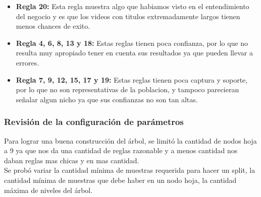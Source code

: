 \begin{itemize}
\begin{itemize}
                    \item \textbf{Regla 20:} Esta regla muestra algo que
                    habiamos visto en el entendimiento del negocio y es que los
                    videos con titulos extremadamente largos tienen menos
                    chances de exito.

                    \item \textbf{Regla 4, 6, 8, 13 y 18:} Estas reglas tienen
                    poca confianza, por lo que no resulta muy apropiado tener
                    en cuenta sus resultados ya que pueden llevar a errores.

                    \item \textbf{Regla 7, 9, 12, 15, 17 y 19:} Estas reglas
                    tienen poca captura y soporte, por lo que no son
                    representativas de la poblacion, y tampoco parecieran
                    señalar algun nicho ya que sus confianzas no son tan altas.

                \end{itemize}
            \end{itemize}

    \subsubsection{Revisión de la configuración de parámetros}
        Para lograr una buena construcción del árbol, se limitó la cantidad de
        nodos hoja a 9 ya que nos da una cantidad de reglas razonable y a menos
        cantidad nos daban reglas mas chicas y en mas cantidad.\\
        Se probó variar la cantidad mínima de muestras requerida para hacer
        un split, la cantidad mínima de muestras que debe haber en un nodo
        hoja, la cantidad máxima de niveles del árbol.

